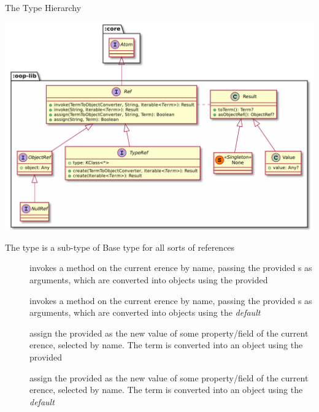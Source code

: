 \documentclass[handout]{beamer}
\begin{document}
\begin{frame}[allowframebreaks]{The  Type Hierarchy}

    \begin{center}
        \includegraphics[width=.8\linewidth]{./img/full-refs.pdf}
    \end{center}

    \framebreak

    \begin{block}{The  type is a sub-type of }
        \centering
        Base type for all sorts of references
    \end{block}
    \begin{description}
        \item[] invokes a \alert{method} on the current erence by name, passing the provided s as arguments, which are converted into objects using the provided 

        \item[] invokes a \alert{method} on the current erence by name, passing the provided s as arguments, which are converted into objects using the \emph{default} 
        
        \item[] assign the provided  as the new value of some \alert{property}/\alert{field} of the current erence, selected by name. The term is converted into an object using the provided 

        \item[] assign the provided  as the new value of some \alert{property}/\alert{field} of the current erence, selected by name. The term is converted into an object using the \emph{default} 
    \end{description}


\end{frame}
\end{document}
